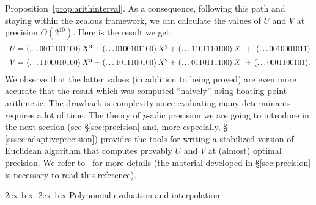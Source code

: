 \documentclass[11pt]{article}
\makeatletter
\numberwithin{equation}{section}
\numberwithin{figure}{section}
\renewcommand\paragraph{\@startsection{paragraph}{4}{\z@}%
                                    {2ex \@plus1ex \@minus.2ex}%
                                    {1ex}%
                                    {\normalfont\normalsize\bfseries}}
\theoremstyle{definition}
\makeatother
\begin{document}
Proposition~\ref{prop:arithinterval}. As a consequence, following this
path and staying within the zealous framework, we can calculate
the values of $U$ and $V$ at precision $O(2^{10})$. Here is the result
we get:
$$\begin{array}{r@{\hspace{0.2ex}}r@{\hspace{0.5ex}}
l@{\hspace{0.2ex}}r@{\hspace{0.5ex}}
l@{\hspace{0.2ex}}r@{\hspace{0.5ex}}
l@{\hspace{0.2ex}}r@{\hspace{0.5ex}}}
U = {}& (\ldots 0011101100) & X^3 
  + {}& (\ldots 0100101100) & X^2 
{}+ {}& (\ldots 1101110100) & X^{\phantom{1}} 
  + {}& (\ldots 0010001011) \medskip \\
V = {}& (\ldots 1100010100) & X^3 
  + {}& (\ldots 1011100100) & X^2 
{}+ {}& (\ldots 0110111100) & X^{\phantom{1}} 
  + {}& (\ldots 0001100101).
\end{array}$$
We observe that the latter values (in addition to being proved) are 
even more accurate that the result which was computed ``naively'' using 
floating-point arithmetic. The drawback is complexity since evaluating
many determinants requires a lot of time. 
The theory of $p$-adic precision we are going to introduce in the next
section (see \S \ref{sec:precision} and, more especially, \S
\ref{sssec:adaptiveprecision}) provides the tools for writing a
stabilized version of Euclidean algorithm that computes provably $U$ 
and $V$ at (almost) optimal precision. We refer to~\cite{Ca17} for more
details (the material developed in  \S \ref{sec:precision} is necessary 
to read this reference).

\paragraph{Polynomial evaluation and interpolation}
\end{document}
